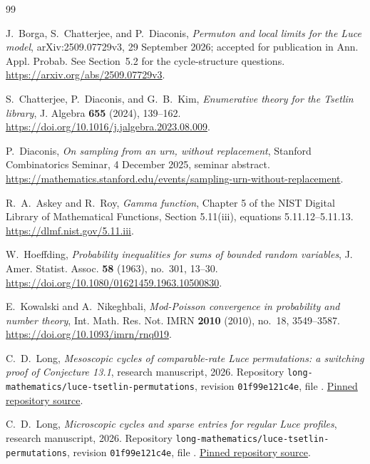 \documentclass[11pt]{article}
\numberwithin{equation}{section}
\theoremstyle{definition}
\theoremstyle{remark}
\begin{document}
\clearpage
\begin{thebibliography}{99}
\footnotesize\raggedright

J.~Borga, S.~Chatterjee, and P.~Diaconis,
\emph{Permuton and local limits for the Luce model},
arXiv:2509.07729v3, 29 September 2026; accepted for publication in
Ann. Appl. Probab. See Section~5.2 for the cycle-structure questions.
\url{https://arxiv.org/abs/2509.07729v3}.

S.~Chatterjee, P.~Diaconis, and G.~B.~Kim,
\emph{Enumerative theory for the Tsetlin library},
J. Algebra \textbf{655} (2024), 139--162.
\url{https://doi.org/10.1016/j.jalgebra.2023.08.009}.

P.~Diaconis,
\emph{On sampling from an urn, without replacement},
Stanford Combinatorics Seminar, 4 December 2025, seminar abstract.
\url{https://mathematics.stanford.edu/events/sampling-urn-without-replacement}.

R.~A.~Askey and R.~Roy,
\emph{Gamma function}, Chapter 5 of the NIST Digital Library of Mathematical Functions,
Section 5.11(iii), equations 5.11.12--5.11.13.
\url{https://dlmf.nist.gov/5.11.iii}.

W.~Hoeffding,
\emph{Probability inequalities for sums of bounded random variables},
J. Amer. Statist. Assoc. \textbf{58} (1963), no.~301, 13--30.
\url{https://doi.org/10.1080/01621459.1963.10500830}.

E.~Kowalski and A.~Nikeghbali,
\emph{Mod-Poisson convergence in probability and number theory},
Int. Math. Res. Not. IMRN \textbf{2010} (2010), no.~18, 3549--3587.
\url{https://doi.org/10.1093/imrn/rnq019}.

C.~D.~Long,
\emph{Mesoscopic cycles of comparable-rate Luce permutations: a switching proof of Conjecture 13.1},
research manuscript, 2026.
Repository \texttt{long-mathematics/luce-tsetlin-permutations},
revision \texttt{01f99e121c4e}, file
.
\href{https://github.com/long-mathematics/luce-tsetlin-permutations/tree/01f99e121c4ea497e3c9e9bcfa83d027c5833742/papers/mesoscopic-switching}{Pinned repository source}.

C.~D.~Long,
\emph{Microscopic cycles and sparse entries for regular Luce profiles},
research manuscript, 2026.
Repository \texttt{long-mathematics/luce-tsetlin-permutations},
revision \texttt{01f99e121c4e}, file
.
\href{https://github.com/long-mathematics/luce-tsetlin-permutations/tree/01f99e121c4ea497e3c9e9bcfa83d027c5833742/papers/regular-profile-cycles}{Pinned repository source}.


\end{thebibliography}
\end{document}
